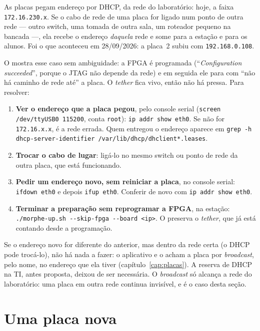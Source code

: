 As placas pegam endereço por DHCP, da rede do laboratório: hoje, a faixa
\texttt{172.16.230.x}. Se o cabo de rede de uma placa for ligado num ponto de
outra rede --- outro switch, uma tomada de outra sala, um roteador pequeno na
bancada ---, ela recebe o endereço \emph{daquela} rede e some para a estação e
para os alunos. Foi o que aconteceu em 28/09/2026: a placa~2 subiu com
\texttt{192.168.0.108}.

O  mostra esse caso sem ambiguidade: a FPGA é programada
(``\emph{Configuration succeeded}'', porque o JTAG não depende da rede) e em
seguida ele para com ``não há caminho de rede até'' a placa. O \emph{tether}
fica vivo, então não há pressa. Para resolver:

\begin{enumerate}
  \item \textbf{Ver o endereço que a placa pegou}, pelo console serial
    (\texttt{screen /dev/ttyUSB0 115200}, conta \texttt{root}):
    \texttt{ip addr show eth0}. Se não for \texttt{172.16.x.x}, é a rede
    errada. Quem entregou o endereço aparece em
    \texttt{grep -h dhcp-server-identifier /var/lib/dhcp/dhclient*.leases}.
  \item \textbf{Trocar o cabo de lugar}: ligá-lo no mesmo switch ou ponto de
    rede da outra placa, que está funcionando.
  \item \textbf{Pedir um endereço novo, sem reiniciar a placa}, no console
    serial: \texttt{ifdown eth0} e depois \texttt{ifup eth0}. Conferir de novo
    com \texttt{ip addr show eth0}.
  \item \textbf{Terminar a preparação sem reprogramar a FPGA}, na estação:
    \texttt{./morphe-up.sh -{}-skip-fpga -{}-board <ip>}. O 
    preserva o \emph{tether}, que já está contando desde a programação.
\end{enumerate}

Se o endereço novo for diferente do anterior, mas dentro da rede certa (o
DHCP pode trocá-lo), não há nada a fazer: o aplicativo e o
 acham a placa por \emph{broadcast}, pelo nome, no endereço
que ela tiver (capítulo~\ref{cap:placas}). A reserva de DHCP na TI, antes
proposta, deixou de ser necessária. O \emph{broadcast} só alcança a rede do
laboratório: uma placa em outra rede continua invisível, e é o caso desta
seção.

\section{Uma placa nova}

